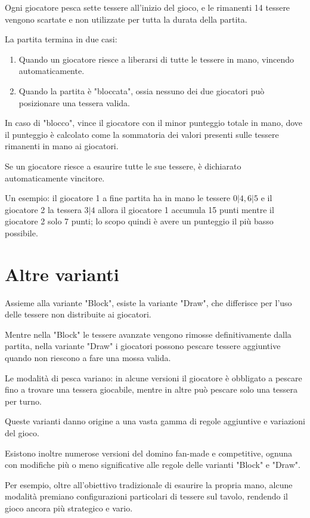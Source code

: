 \documentclass[a4paper,12pt]{report}
\begin{document}
Ogni giocatore pesca sette tessere all'inizio del gioco, e le rimanenti 14 tessere vengono scartate e non utilizzate per tutta la durata della partita. 

La partita termina in due casi:

\begin{enumerate}
    \item Quando un giocatore riesce a liberarsi di tutte le tessere in mano, vincendo automaticamente.
    \item Quando la partita è "bloccata", ossia nessuno dei due giocatori può posizionare una tessera valida.
\end{enumerate}

In caso di "blocco", vince il giocatore con il minor punteggio totale in mano, dove il punteggio è calcolato come la sommatoria dei valori presenti sulle tessere rimanenti in mano ai giocatori. 

Se un giocatore riesce a esaurire tutte le sue tessere, è dichiarato automaticamente vincitore.

Un esempio: il giocatore 1 a fine partita ha in mano le tessere \(0|4, 6|5\) e il giocatore 2 la tessera \(3|4\) allora il giocatore 1 accumula 15 punti mentre il giocatore 2 solo 7 punti; lo scopo quindi è avere un punteggio il più basso possibile.


\section{Altre varianti}

Assieme alla variante "Block", esiste la variante "Draw", che differisce per l'uso delle tessere non distribuite ai giocatori. 

Mentre nella "Block" le tessere avanzate vengono rimosse definitivamente dalla partita, nella variante "Draw" i giocatori possono pescare tessere aggiuntive quando non riescono a fare una mossa valida. 

Le modalità di pesca variano: in alcune versioni il giocatore è obbligato a pescare fino a trovare una tessera giocabile, mentre in altre può pescare solo una tessera per turno.

Queste varianti danno origine a una vasta gamma di regole aggiuntive e variazioni del gioco. 

Esistono inoltre numerose versioni del domino fan-made e competitive, ognuna con modifiche più o meno significative alle regole delle varianti "Block" e "Draw". 

Per esempio, oltre all’obiettivo tradizionale di esaurire la propria mano, alcune modalità premiano configurazioni particolari di tessere sul tavolo, rendendo il gioco ancora più strategico e vario.
\end{document}
